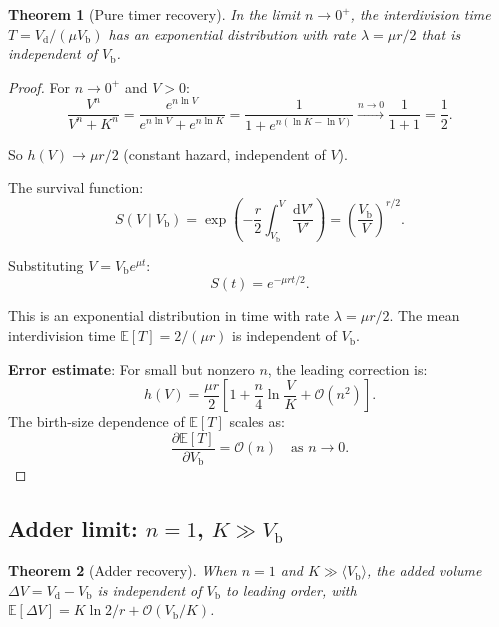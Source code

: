 \documentclass[11pt]{article}
\newcommand{\Vb}{V_{\mathrm{b}}}
\newcommand{\Vd}{V_{\mathrm{d}}}
\newcommand{\DV}{\Delta V}
\newcommand{\E}{\mathbb{E}}
\newcommand{\dd}{\mathrm{d}}
\newcommand{\Order}{\mathcal{O}}
\newtheorem{theorem}{Theorem}
\begin{document}
\begin{theorem}[Pure timer recovery]
  In the limit $n \to 0^+$, the interdivision time $T = \Vd/(\mu\Vb)$ has an exponential distribution with rate $\lambda = \mu r/2$ that is independent of $\Vb$.
\end{theorem}

\begin{proof}
For $n \to 0^+$ and $V > 0$:
\begin{equation}
  \frac{V^n}{V^n + K^n} = \frac{e^{n\ln V}}{e^{n\ln V} + e^{n\ln K}}
  = \frac{1}{1 + e^{n(\ln K - \ln V)}} \xrightarrow{n \to 0} \frac{1}{1+1} = \frac{1}{2}.
\end{equation}

So $h(V) \to \mu r/2$ (constant hazard, independent of $V$).

The survival function:
\begin{equation}
  S(V \mid \Vb) = \exp\!\left(-\frac{r}{2}\int_{\Vb}^{V}\frac{\dd V'}{V'}\right) = \left(\frac{\Vb}{V}\right)^{r/2}.
\end{equation}

Substituting $V = \Vb e^{\mu t}$:
\begin{equation}
  S(t) = e^{-\mu r t/2}.
\end{equation}

This is an exponential distribution in time with rate $\lambda = \mu r/2$. The mean interdivision time $\E[T] = 2/(\mu r)$ is independent of $\Vb$.

\textbf{Error estimate}: For small but nonzero $n$, the leading correction is:
\begin{equation}
  h(V) = \frac{\mu r}{2}\left[1 + \frac{n}{4}\ln\frac{V}{K} + \Order(n^2)\right].
\end{equation}
The birth-size dependence of $\E[T]$ scales as:
\begin{equation}
  \frac{\partial \E[T]}{\partial \Vb} = \Order(n) \quad \text{as } n \to 0.
\end{equation}
\end{proof}

\subsection{Adder limit: $n = 1$, $K \gg \Vb$}

\begin{theorem}[Adder recovery]
  When $n = 1$ and $K \gg \langle \Vb \rangle$, the added volume $\DV = \Vd - \Vb$ is independent of $\Vb$ to leading order, with $\E[\DV] = K\ln 2/r + \Order(\Vb/K)$.
\end{theorem}
\end{document}
